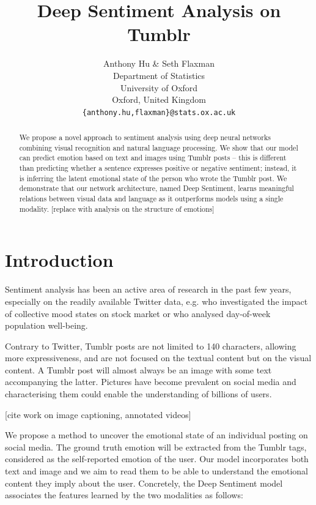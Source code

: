 \documentclass{article} %
\title{Deep Sentiment Analysis on Tumblr}
\author{Anthony Hu \& Seth Flaxman \\
Department of Statistics\\
University of Oxford\\
Oxford, United Kingdom \\
\texttt{\{anthony.hu,flaxman\}@stats.ox.ac.uk}
}
\begin{document}
\maketitle

\begin{abstract}
We propose a novel approach to sentiment analysis using deep neural networks combining visual recognition and natural language processing. %
We show that our model can predict emotion based on text and images using Tumblr posts -- this is different than predicting whether a sentence expresses positive or negative sentiment; instead, it is inferring the latent emotional state of the person who wrote the Tumblr post.
We demonstrate that our network architecture, named Deep Sentiment, learns meaningful relations between visual data and language as it outperforms models using a single modality. [replace with analysis on the structure of emotions]
\end{abstract}

\section{Introduction}
Sentiment analysis has been an active area of research in the past few years, especially on the readily available Twitter data, e.g. \citet{Bollen} who investigated the impact of collective mood states on stock market or \cite{Flaxman-16} who analysed day-of-week population well-being.

Contrary to Twitter, Tumblr posts are not limited to 140 characters, allowing more expressiveness, and are not focused on the textual content but on the visual content. A Tumblr post will almost always be an image with some text accompanying the latter. Pictures have become prevalent on social media and characterising them could enable the understanding of billions of users.

[cite work on image captioning, annotated videos]

We propose a method to uncover the emotional state of an individual posting on social media. The ground truth emotion will be extracted from the Tumblr tags, considered as the self-reported emotion of the user. Our model incorporates both text and image and we aim to read them to be able to understand the emotional content they imply about the user. Concretely, the Deep Sentiment model associates the features learned by the two modalities as follows:
\end{document}

